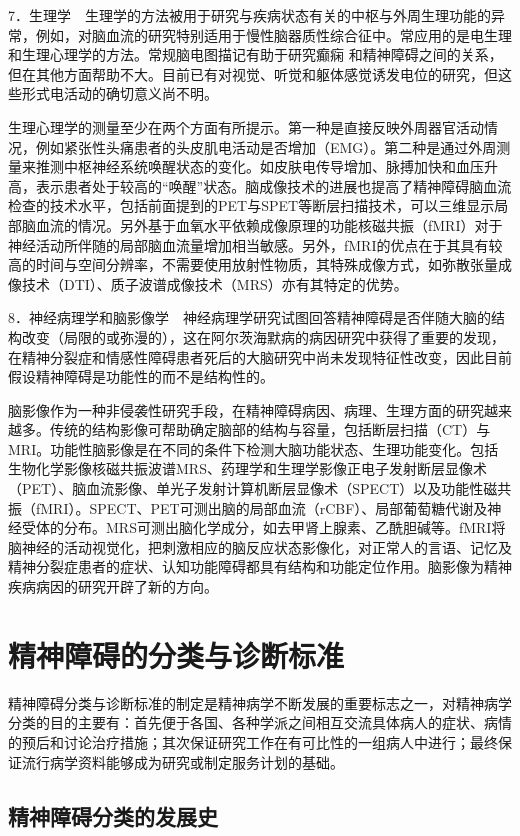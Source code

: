 7．生理学　生理学的方法被用于研究与疾病状态有关的中枢与外周生理功能的异常，例如，对脑血流的研究特别适用于慢性脑器质性综合征中。常应用的是电生理和生理心理学的方法。常规脑电图描记有助于研究癫痫
和精神障碍之间的关系，但在其他方面帮助不大。目前已有对视觉、听觉和躯体感觉诱发电位的研究，但这些形式电活动的确切意义尚不明。

生理心理学的测量至少在两个方面有所提示。第一种是直接反映外周器官活动情况，例如紧张性头痛患者的头皮肌电活动是否增加（EMG）。第二种是通过外周测量来推测中枢神经系统唤醒状态的变化。如皮肤电传导增加、脉搏加快和血压升高，表示患者处于较高的``唤醒''状态。脑成像技术的进展也提高了精神障碍脑血流检查的技术水平，包括前面提到的PET与SPET等断层扫描技术，可以三维显示局部脑血流的情况。另外基于血氧水平依赖成像原理的功能核磁共振（fMRI）对于神经活动所伴随的局部脑血流量增加相当敏感。另外，fMRI的优点在于其具有较高的时间与空间分辨率，不需要使用放射性物质，其特殊成像方式，如弥散张量成像技术（DTI）、质子波谱成像技术（MRS）亦有其特定的优势。

8．神经病理学和脑影像学　神经病理学研究试图回答精神障碍是否伴随大脑的结构改变（局限的或弥漫的），这在阿尔茨海默病的病因研究中获得了重要的发现，在精神分裂症和情感性障碍患者死后的大脑研究中尚未发现特征性改变，因此目前假设精神障碍是功能性的而不是结构性的。

脑影像作为一种非侵袭性研究手段，在精神障碍病因、病理、生理方面的研究越来越多。传统的结构影像可帮助确定脑部的结构与容量，包括断层扫描（CT）与MRI。功能性脑影像是在不同的条件下检测大脑功能状态、生理功能变化。包括生物化学影像核磁共振波谱MRS、药理学和生理学影像正电子发射断层显像术（PET）、脑血流影像、单光子发射计算机断层显像术（SPECT）以及功能性磁共振（fMRI）。SPECT、PET可测出脑的局部血流（rCBF）、局部葡萄糖代谢及神经受体的分布。MRS可测出脑化学成分，如去甲肾上腺素、乙酰胆碱等。fMRI将脑神经的活动视觉化，把刺激相应的脑反应状态影像化，对正常人的言语、记忆及精神分裂症患者的症状、认知功能障碍都具有结构和功能定位作用。脑影像为精神疾病病因的研究开辟了新的方向。

\section{精神障碍的分类与诊断标准}

精神障碍分类与诊断标准的制定是精神病学不断发展的重要标志之一，对精神病学分类的目的主要有：首先便于各国、各种学派之间相互交流具体病人的症状、病情的预后和讨论治疗措施；其次保证研究工作在有可比性的一组病人中进行；最终保证流行病学资料能够成为研究或制定服务计划的基础。

\subsection{精神障碍分类的发展史}

